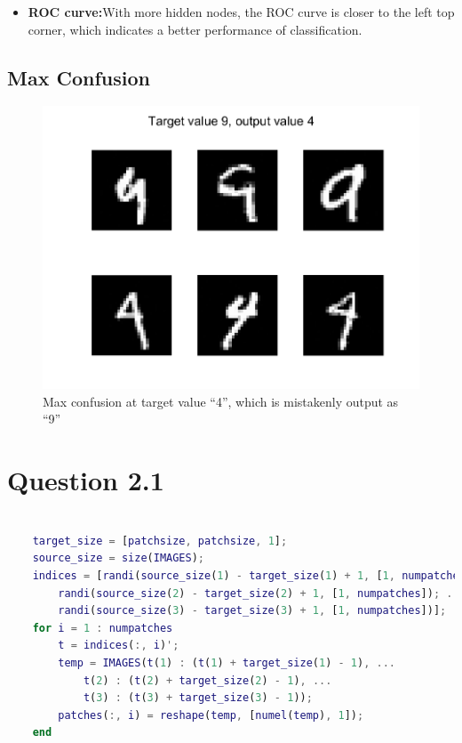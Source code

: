 \documentclass{article}
\begin{document}
{{\begin{itemize}
            \item \textbf{ROC curve:}\quad With more hidden nodes, the ROC curve is closer to the left top corner, which indicates a better performance of classification. 

            
        \end{itemize}
    }

    \subsection*{Max Confusion}
    {
        \begin{figure}[H]
            \centering
            \includegraphics[width = 0.7\linewidth]{src1/max_confusion.png}
            \caption{Max confusion at target value ``4'', which is mistakenly output as ``9''}
        \end{figure}
    }
}

\section*{Question 2.1}
{
        \begin{lstlisting}[language=MATLAB]

    target_size = [patchsize, patchsize, 1];
    source_size = size(IMAGES);
    indices = [randi(source_size(1) - target_size(1) + 1, [1, numpatches]); ...
        randi(source_size(2) - target_size(2) + 1, [1, numpatches]); ...
        randi(source_size(3) - target_size(3) + 1, [1, numpatches])];
    for i = 1 : numpatches
        t = indices(:, i)';
        temp = IMAGES(t(1) : (t(1) + target_size(1) - 1), ...
            t(2) : (t(2) + target_size(2) - 1), ...
            t(3) : (t(3) + target_size(3) - 1));
        patches(:, i) = reshape(temp, [numel(temp), 1]);
    end

        \end{lstlisting}
}
\end{document}
